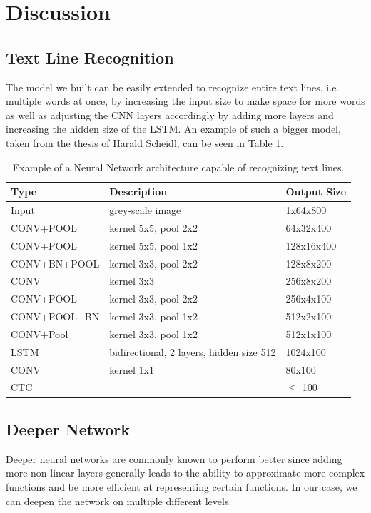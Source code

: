 \documentclass{article}
\begin{document}
\newpage
\section{Discussion}
\subsection{Text Line Recognition}
The model we built can be easily extended to recognize entire text lines, i.e. multiple words at once, by increasing the input size to make space for more words as well as adjusting the CNN layers accordingly by adding more layers and increasing the hidden size of the LSTM. An example of such a bigger model, taken from the thesis of Harald Scheidl\cite{ScheidlThesis}, can be seen in Table \ref{tab:BigModel}.
\begin{table}[H]
\centering
\begin{tabular}{l|l|l}
Type & Description & Output Size \\ \hline
Input & grey-scale image & 1x64x800 \\ \hline
CONV+POOL & kernel 5x5, pool 2x2 & 64x32x400 \\ \hline
CONV+POOL & kernel 5x5, pool 1x2 & 128x16x400 \\ \hline
CONV+BN+POOL & kernel 3x3, pool 2x2 & 128x8x200 \\ \hline
CONV & kernel 3x3 & 256x8x200 \\ \hline
CONV+POOL & kernel 3x3, pool 2x2 & 256x4x100 \\ \hline
CONV+POOL+BN & kernel 3x3, pool 1x2 & 512x2x100 \\ \hline
CONV+Pool & kernel 3x3, pool 1x2 & 512x1x100 \\ \hline
LSTM         & bidirectional, 2 layers, hidden size 512 & 1024x100 \\ \hline
CONV         & kernel 1x1 & 80x100 \\ \hline
CTC          &      & \(\leqslant\) 100 \\ \hline
\end{tabular}
\caption{Example of a Neural Network architecture capable of recognizing text lines.}
\label{tab:BigModel}
\end{table}
\subsection{Deeper Network}
Deeper neural networks are commonly known to perform better since adding more non-linear layers generally leads to the ability to approximate more complex functions and be more efficient at representing certain functions\cite{Bengio}\cite{LeRoux}\cite{Delalleau}\cite{Pascanu1}. In our case, we can deepen the network on multiple different levels.
\end{document}
